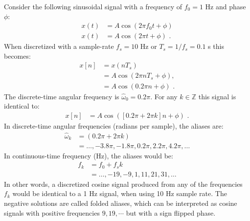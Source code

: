 Consider the following sinusoidal signal with a frequency of $f_0 =1$ Hz and phase $\phi$:
\begin{align}
  x(t) & =A\cos(2\pi f_0 t + \phi)  \\
  x(t) & =A\cos(2\pi t + \phi)\,\,.
\end{align}
When discretized with a sample-rate $f_s=10$ Hz or $T_s=1/f_s = 0.1$ s this becomes:
\begin{align}
  x[n] & =x(nT_s)                     \\
       & =A\cos(2\pi n T_s + \phi),   \\
       & =A\cos(0.2\pi n + \phi)\,\,.
\end{align}
The discrete-time angular frequency is $\hat{\omega}_0 = 0.2\pi$. 
For any $k\in\mathbb{Z}$ this signal is identical to:
\begin{align}
  x[n] & =A\cos([0.2\pi + 2\pi k] n + \phi)\,\,.
\end{align}
In discrete-time angular frequencies (radians per sample), the aliases are:
\begin{align}
  \hat{\omega}_k & = (0.2\pi+2\pi k)                                   \\
                 & =\ldots,-3.8\pi,-1.8\pi,0.2\pi,2.2\pi,4.2\pi,\ldots
\end{align}
In continuous-time frequency (Hz), the aliases would be:
\begin{align}
  f_k & =f_0 + f_s k                     \\
      & =\ldots,-19,-9,1,11,21,31,\ldots
\end{align}
In other words, a discretized cosine signal produced from any of the frequencies $f_k$ 
would be identical to a 1 Hz signal, when using 10 Hz sample rate. The negative solutions 
are called folded aliases, which can be interpreted as cosine signals with positive 
frequencies $9,19,\cdots$ but with a sign flipped phase.

